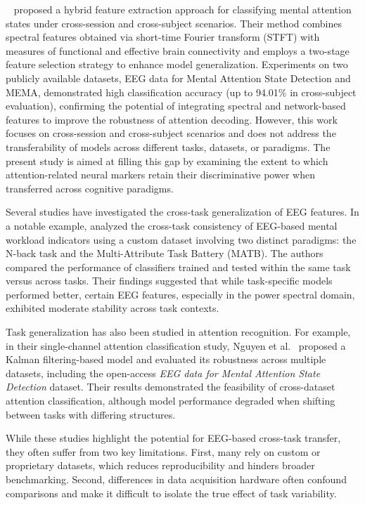 \documentclass[utf8]{FrontiersinHarvard} %
\begin{document}
~\cite{chen2025hybrid} proposed a hybrid feature extraction approach for classifying mental attention states under cross-session and cross-subject scenarios. Their method combines spectral features obtained via short-time Fourier transform (STFT) with measures of functional and effective brain connectivity and employs a two-stage feature selection strategy to enhance model generalization. Experiments on two publicly available datasets, EEG data for Mental Attention State Detection and MEMA, demonstrated high classification accuracy (up to 94.01\% in cross-subject evaluation), confirming the potential of integrating spectral and network-based features to improve the robustness of attention decoding. However, this work focuses on cross-session and cross-subject scenarios and does not address the transferability of models across different tasks, datasets, or paradigms. The present study is aimed at filling this gap by examining the extent to which attention-related neural markers retain their discriminative power when transferred across cognitive paradigms.


Several studies have investigated the cross-task generalization of EEG features. In a notable example, \cite{zhang2021cross} analyzed the cross-task consistency of EEG-based mental workload indicators using a custom dataset involving two distinct paradigms: the N-back task and the Multi-Attribute Task Battery (MATB). The authors compared the performance of classifiers trained and tested within the same task versus across tasks. Their findings suggested that while task-specific models performed better, certain EEG features, especially in the power spectral domain, exhibited moderate stability across task contexts.

Task generalization has also been studied in attention recognition. For example, in their single-channel attention classification study, Nguyen et al.~\cite{nguyen2022kalman} proposed a Kalman filtering-based model and evaluated its robustness across multiple datasets, including the open-access \textit{EEG data for Mental Attention State Detection} dataset. Their results demonstrated the feasibility of cross-dataset attention classification, although model performance degraded when shifting between tasks with differing structures.

While these studies highlight the potential for EEG-based cross-task transfer, they often suffer from two key limitations. First, many rely on custom or proprietary datasets, which reduces reproducibility and hinders broader benchmarking. Second, differences in data acquisition hardware often confound comparisons and make it difficult to isolate the true effect of task variability.
\end{document}
